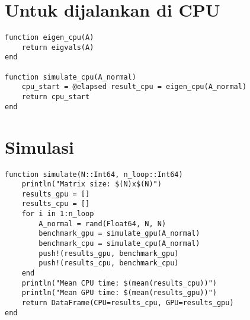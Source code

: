 \section{Untuk dijalankan di CPU}

\begin{lstlisting}
function eigen_cpu(A)
    return eigvals(A)
end

function simulate_cpu(A_normal)
    cpu_start = @elapsed result_cpu = eigen_cpu(A_normal)
    return cpu_start
end
\end{lstlisting}

\section{Simulasi}

\begin{lstlisting}
function simulate(N::Int64, n_loop::Int64)
    println("Matrix size: $(N)x$(N)")
    results_gpu = []
    results_cpu = []
    for i in 1:n_loop
        A_normal = rand(Float64, N, N)
        benchmark_gpu = simulate_gpu(A_normal)
        benchmark_cpu = simulate_cpu(A_normal)
        push!(results_gpu, benchmark_gpu)
        push!(results_cpu, benchmark_cpu)
    end
    println("Mean CPU time: $(mean(results_cpu))")
    println("Mean GPU time: $(mean(results_gpu))")
    return DataFrame(CPU=results_cpu, GPU=results_gpu)
end
\end{lstlisting}
